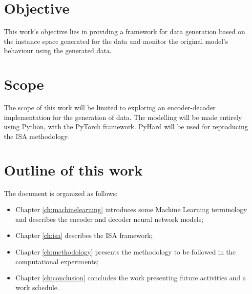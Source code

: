 \section{Objective}

This work's objective lies in providing a framework for data generation based on the instance space generated for the data and monitor the original model's behaviour using the generated data.

\section{Scope}

The scope of this work will be limited to exploring an encoder-decoder implementation for the generation of data.  The modelling will be made entirely using Python, with the PyTorch \cite{paszke2019pytorch} framework. PyHard \cite{Lorena2022} will be used for reproducing the ISA methodology.




\section{Outline of this work}

The document is organized as follows:

\begin{itemize}
	\item Chapter \ref{ch:machinelearning}  introduces some Machine Learning terminology and describes the encoder and decoder neural network models;
	\item Chapter \ref{ch:isa} describes the ISA framework;
	\item Chapter \ref{ch:methodology} presents the methodology to be followed in the computational experiments;
	\item Chapter \ref{ch:conclusion} concludes the work presenting future activities and a work schedule.
\end{itemize}
